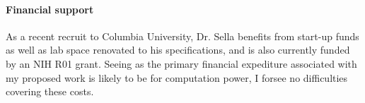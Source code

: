 \documentclass[11pt]{article}
\begin{document}
\paragraph{Financial support}

As a recent recruit to Columbia University, Dr. Sella benefits from start-up funds as well as lab space renovated to his specifications, and is also currently funded by an NIH R01 grant. Seeing as the primary financial expediture associated with my proposed work is likely to be for computation power, I forsee no difficulties covering these costs. 
\end{document}
